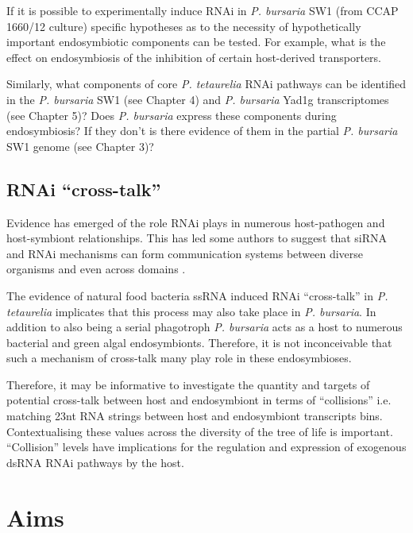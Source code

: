 If it is possible to experimentally induce RNAi in \textit{P. bursaria} SW1 (from CCAP 1660/12 culture)
specific hypotheses as to the necessity of hypothetically important
endosymbiotic components can be tested. For example, what is the effect
on endosymbiosis of the inhibition of certain host-derived transporters.

Similarly, what components of core \textit{P. tetaurelia} RNAi pathways
can be identified 
in the \textit{P. bursaria} SW1 (see Chapter 4) and \textit{P. bursaria} Yad1g transcriptomes
(see Chapter 5)?  Does \textit{P. bursaria} express these components during
endosymbiosis?  If they don't is there evidence of them in the partial 
\textit{P. bursaria} SW1 genome (see Chapter 3)?


\subsection{RNAi ``cross-talk''}
Evidence has emerged of the role RNAi plays in numerous host-pathogen 
\citep{Nowara2010,LaMonte2012,Weiberg2013,Buck2014}
and host-symbiont \citep{Helber2011,Koch2013} relationships.
This has led some authors to suggest that siRNA and RNAi mechanisms 
can form communication systems between diverse organisms and even across
domains \citep{Liang2013,Knip2014,Weiberg2015}.


The evidence of natural food bacteria ssRNA induced RNAi ``cross-talk''
in \textit{P. tetaurelia} \citep{Carradec2015} implicates
that this process may also take place in \textit{P. bursaria}.
In addition to also being a serial phagotroph \textit{P. bursaria}
acts as a host to numerous bacterial and green algal endosymbionts.
Therefore, it is not inconceivable that such a mechanism of 
cross-talk many play role in these endosymbioses.


Therefore, it may be informative to investigate the quantity and targets of
potential cross-talk between host and endosymbiont in terms of 
``collisions''  i.e. matching 23nt RNA strings between host and endosymbiont
transcripts bins.   Contextualising these values 
across the diversity of the tree of life is important.
``Collision'' levels have implications for the regulation and expression of exogenous dsRNA
RNAi pathways by the host. 


\section{Aims}

